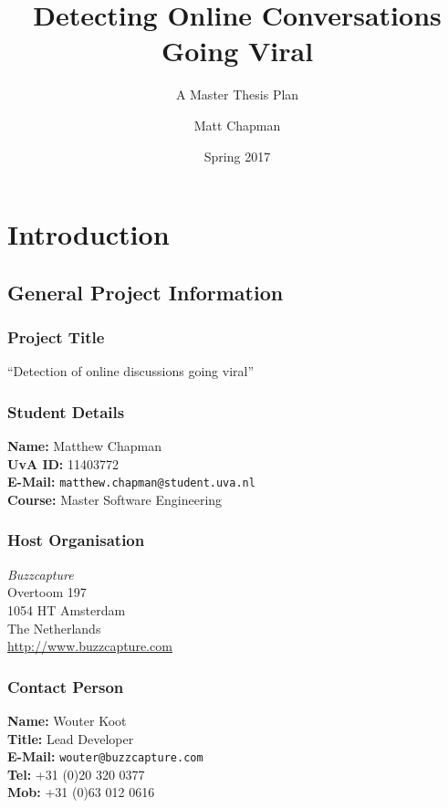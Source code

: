 \documentclass{uvamscse}
\title{Detecting Online Conversations Going Viral}
\subtitle{A Master Thesis Plan}
\date{Spring 2017}
\author{Matt Chapman}
\begin{document}
\maketitle

\chapter{Introduction}

\section{General Project Information}

\subsection{Project Title}

``Detection of online discussions going viral''

\subsection{Student Details}

\noindent
\textbf{Name:} Matthew Chapman\\
\textbf{UvA ID:} 11403772\\
\textbf{E-Mail:} \texttt{matthew.chapman@student.uva.nl}\\
\textbf{Course:} Master Software Engineering\\


\subsection{Host Organisation}

\noindent
\textit{Buzzcapture}\\
Overtoom 197\\
1054 HT Amsterdam\\
The Netherlands\\
\url{http://www.buzzcapture.com}\\


\subsection{Contact Person}

\noindent
\textbf{Name:} Wouter Koot\\
\textbf{Title:} Lead Developer\\
\textbf{E-Mail:} \texttt{wouter@buzzcapture.com}\\
\textbf{Tel:} +31 (0)20 320 0377\\
\textbf{Mob:} +31 (0)63 012 0616\\
\end{document}
